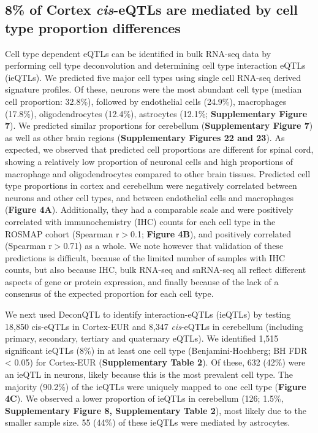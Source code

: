 \subsection{8\% of Cortex \emph{cis}-eQTLs are mediated by cell type proportion differences  }
Cell type dependent eQTLs can be identified in bulk RNA-seq data by performing cell type deconvolution and determining cell type interaction eQTLs (ieQTLs)\cite{donovanCellularDeconvolutionGTEx2020,glastonburyCellTypeHeterogeneityAdipose2019,raulaguirregamboaDeconvolutionBulkBlood2020}. We predicted five major cell types using single cell RNA-seq derived signature profiles\cite{zhengyuCellMapCharacterizingType}. Of these, neurons were the most abundant cell type (median cell proportion: 32.8\%), followed by endothelial cells (24.9\%), macrophages (17.8\%), oligodendrocytes (12.4\%), astrocytes (12.1\%; \textbf{Supplementary Figure 7}). We predicted similar proportions for cerebellum (\textbf{Supplementary Figure 7}) as well as other brain regions (\textbf{Supplementary Figures 22 and 23}). As expected, we observed that predicted cell proportions are different for spinal cord, showing a relatively low proportion of neuronal cells and high proportions of macrophage and oligodendrocytes compared to other brain tissues. Predicted cell type proportions in cortex and cerebellum were negatively correlated between neurons and other cell types, and between endothelial cells and macrophages (\textbf{Figure 4A}). Additionally, they had a comparable scale and were positively correlated with immunochemistry (IHC) counts for each cell type in the ROSMAP cohort (Spearman r$>$0.1; \textbf{Figure 4B})\cite{patrickDeconvolvingContributionsCelltype2020}, and positively correlated (Spearman r$>$0.71) as a whole. We note however that validation of these predictions is difficult, because of the limited number of samples with IHC counts, but also because IHC, bulk RNA-seq and snRNA-seq all reflect different aspects of gene or protein expression, and finally because of the lack of a consensus of the expected proportion for each cell type\cite{herculano-houzelHumanBrainNumbers2009,vonbartheldSearchTrueNumbers2016}. 

We next used DeconQTL\cite{raulaguirregamboaDeconvolutionBulkBlood2020} to identify interaction-eQTLs (ieQTLs) by testing 18,850 cis-eQTLs in Cortex-EUR and 8,347 \emph{cis}-eQTLs in cerebellum (including primary, secondary, tertiary and quaternary eQTLs). We identified 1,515 significant ieQTLs (8\%) in at least one cell type (Benjamini-Hochberg; BH FDR < 0.05) for Cortex-EUR (\textbf{Supplementary Table 2}). Of these, 632 (42\%) were an ieQTL in neurons, likely because this is the most prevalent cell type. The majority (90.2\%) of the ieQTLs were uniquely mapped to one cell type (\textbf{Figure 4C}). We observed a lower proportion of ieQTLs in cerebellum (126; 1.5\%, \textbf{Supplementary Figure 8, Supplementary Table 2}), most likely due to the smaller sample size. 55 (44\%) of these ieQTLs were mediated by astrocytes.  

